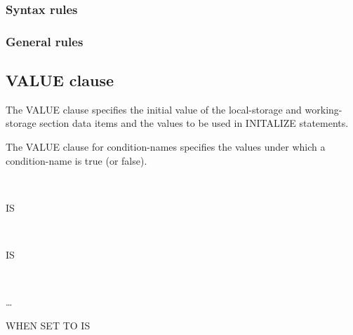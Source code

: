 \subsubsection{Syntax rules}

\subsubsection{General rules}

\subsection{VALUE clause}

The VALUE clause specifies the initial value of the local-storage and working-storage section data items and the values to be used in INITALIZE statements.

The VALUE clause for condition-names specifies the values under which a condition-name is true (or false).

\begin{syntax}
  \begin{1=}
     \\
  \end{1=}
  \begin{0-1}
    IS \\
  \end{0-1}
  \literal
\end{syntax}

\begin{syntax}
  \begin{1=}
     \\
  \end{1=}
  \begin{0-1}
    IS \\
  \end{0-1}
  \begin{1=}
    \literal
    \begin{0-1}
      \begin{1=}
         \\
      \end{1=}
      \literal
    \end{0-1}
  \end{1=} \ldots

  \begin{0-1}
    WHEN SET TO  IS \literal
  \end{0-1}
\end{syntax}

